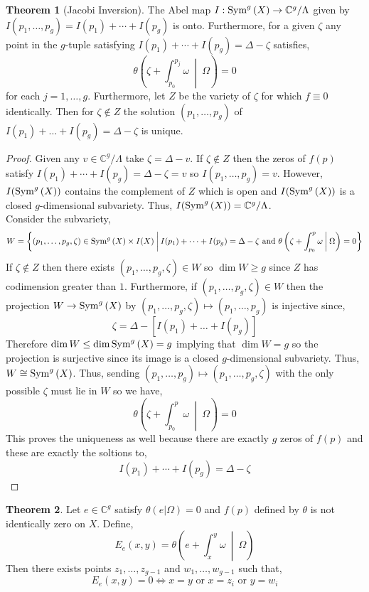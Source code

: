 \documentclass[12pt]{extarticle}
\newcommand{\C}{\mathbb{C}}
\theoremstyle{definition}
\newtheorem{theorem}{Theorem}[section]
\begin{document}
\begin{theorem}[Jacobi Inversion]
The Abel map $I : \Sym{g}{X} \to \C^g / \Lambda$ given by $I(p_1, \dots, p_g) = I(p_1) + \cdots + I(p_g)$ is onto. Furthermore, for a given $\zeta$ any point in the $g$-tuple satisfying $I(p_1) + \cdots + I(p_g) = \Delta - \zeta$ satisfies,
\[ \theta\left( \zeta + \int_{p_0}^{p_j} \omega \: \middle| \: \Omega \right) = 0 \]
for each $j = 1, \dots, g$. Furthermore, let $Z$ be the variety of $\zeta$ for which $f \equiv 0$ identically. Then for $\zeta \notin Z$ the solution $(p_1, \dots, p_g)$ of $I(p_1) + \dots + I(p_g) = \Delta - \zeta$ is unique. 
\end{theorem}

\begin{proof}
Given any $v \in \C^g / \Lambda$ take $\zeta = \Delta - v$. If $\zeta \notin Z$ then the zeros of $f(p)$ satisfy $I(p_1) + \cdots + I(p_g) = \Delta - \zeta = v$ so $I(p_1, \dots, p_g) = v$. However, $I(\mathrm{Sym}^{g}\left(X\right))$ contains the complement of $Z$ which is open and $I(\mathrm{Sym}^{g}\left(X\right))$ is a closed $g$-dimensional subvariety. Thus, $I(\Sym{g}{X}) = \C^g / \Lambda$. 
\bigskip\\
Consider the subvariety,
\[ W = \left\{ (p_1, \dots, p_g, \zeta) \in \mathrm{Sym}^{g}\left(X\right) \times I(X) \: \middle| \: I(p_1) + \cdots + I(p_g) = \Delta - \zeta \text{ and } \theta\left(\zeta + \int_{p_0}^p \omega \: \middle| \: \Omega \right) = 0 \right\} \]
If $\zeta \notin Z$ then there exists $(p_1, \dots, p_g, \zeta) \in W$ so $\dim{W} \ge g$ since $Z$ has codimension greater than $1$. Furthermore, if $(p_1, \dots, p_g, \zeta) \in W$ then the projection $W \to \mathrm{Sym}^{g}\left(X\right)$ by $(p_1, \dots, p_g, \zeta) \mapsto (p_1, \dots, p_g)$ is injective since,
\[ \zeta = \Delta - [I(p_1) + \dots + I(p_g)] \] Therefore $\dim{W} \le \dim{\mathrm{Sym}^{g}\left(X\right)} = g$ implying that $\dim{W} = g$ so the projection is surjective since its image is a closed $g$-dimensional subvariety. Thus, $W \cong \mathrm{Sym}^{g}\left(X\right)$. Thus, sending $(p_1, \dots, p_g) \mapsto (p_1, \dots, p_g, \zeta)$ with the only possible $\zeta$ must lie in $W$ so we have,
\[ \theta\left(\zeta + \int_{p_0}^p \omega \: \middle| \: \Omega \right) = 0 \]
This proves the uniqueness as well because there are exactly $g$ zeros of $f(p)$ and these are exactly the soltions to,
\[ I(p_1) + \cdots + I(p_g) = \Delta - \zeta \]
\end{proof}

\begin{theorem}
Let $e \in \C^g$ satisfy $\theta(e | \Omega) = 0$ and $f(p)$ defined by $\theta$ is not identically zero on $X$. Define,
\[ E_e(x,y) = \theta\left(e + \int_x^y \omega \: \middle| \: \Omega \right) \]
Then there exists points $z_1, \dots, z_{g-1}$ and $w_1, \dots, w_{g - 1}$ 
such that,
\[ E_e(x,y) = 0 \iff x = y \text{ or } x = z_i \text{ or } y = w_i \]
\end{theorem}
\end{document}
